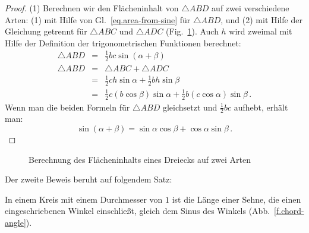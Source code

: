 \begin{proof}
(1)
Berechnen wir den Flächeninhalt von $\triangle ABD$ auf zwei verschiedene Arten: (1) mit Hilfe von Gl.~\ref{eq.area-from-sine} für $\triangle ABD$, und (2) mit Hilfe der Gleichung getrennt für $\triangle ABC$ und $\triangle ADC$ (Fig.~\ref{f.sin-sum2}).
Auch $h$ wird zweimal mit Hilfe der Definition der trigonometrischen Funktionen berechnet:
\begin{eqnarray*}
\triangle ABD &=& \frac{1}{2}bc\sin(\alpha+\beta)\\
\triangle ABD &=& \triangle ABC+\triangle ADC\\
&=& \frac{1}{2}ch\sin \alpha + \frac{1}{2}bh\sin \beta\\
&=& \frac{1}{2}c(b\cos\beta)\sin \alpha + \frac{1}{2}b(c\cos\alpha)\sin \beta\,.
\end{eqnarray*}
Wenn man die beiden Formeln für $\triangle ABD$ gleichsetzt und $\frac{1}{2}bc$ aufhebt, erhält man:
\[
\sin(\alpha+\beta)=\sin\alpha\cos\beta+\cos \alpha\sin\beta\,.
\]
\end{proof}

\begin{figure}[tb]
\begin{center}
\end{center}
\caption{Berechnung des Flächeninhalts eines Dreiecks auf zwei Arten}\label{f.sin-sum2}
\end{figure}

Der zweite Beweis beruht auf folgendem Satz:
\begin{theorem}
In einem Kreis mit einem Durchmesser von $1$ ist die Länge einer Sehne, die einen eingeschriebenen Winkel einschließt, gleich dem Sinus des Winkels (Abb.~\ref{f.chord-angle}).
\end{theorem}

